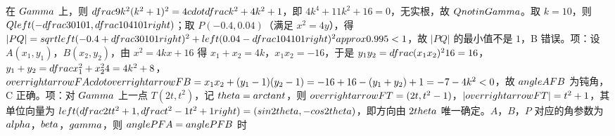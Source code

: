 在 $\\Gamma$ 上，则 $\\dfrac{9k^{2}}{(k^{2}+1)^{2}}=4\\cdot\\dfrac{k^{2}+4}{k^{2}+1}$，即 $4k^{4}+11k^{2}+16=0$，无实根，故 $Q\\notin\\Gamma$。取 $k=10$，则 $Q\\left(-\\dfrac{30}{101},\\dfrac{104}{101}\\right)$；取 $P(-0.4,0.04)$（满足 $x^{2}=4y$），得 $|PQ|=\\sqrt{\\left(-0.4+\\dfrac{30}{101}\\right)^{2}+\\left(0.04-\\dfrac{104}{101}\\right)^{2}}\\approx0.995<1$，故 $|PQ|$ 的最小值不是 $1$，B 错误。\nC 项：设 $A(x_{1},y_{1})$，$B(x_{2},y_{2})$，由 $x^{2}=4kx+16$ 得 $x_{1}+x_{2}=4k$，$x_{1}x_{2}=-16$，于是 $y_{1}y_{2}=\\dfrac{(x_{1}x_{2})^{2}}{16}=16$，$y_{1}+y_{2}=\\dfrac{x_{1}^{2}+x_{2}^{2}}{4}=4k^{2}+8$，\n$\\overrightarrow{FA}\\cdot\\overrightarrow{FB}=x_{1}x_{2}+(y_{1}-1)(y_{2}-1)=-16+16-(y_{1}+y_{2})+1=-7-4k^{2}<0$，故 $\\angle AFB$ 为钝角，C 正确。\nD 项：对 $\\Gamma$ 上一点 $T(2t,t^{2})$，记 $\\theta=\\arctan t$，则 $\\overrightarrow{FT}=(2t,t^{2}-1)$，$|\\overrightarrow{FT}|=t^{2}+1$，其单位向量为 $\\left(\\dfrac{2t}{t^{2}+1},\\dfrac{t^{2}-1}{t^{2}+1}\\right)=(\\sin 2\\theta,-\\cos 2\\theta)$，即方向由 $2\\theta$ 唯一确定。 $A$，$B$，$P$ 对应的角参数为 $\\alpha$，$\\beta$，$\\gamma$，则 $\\angle PFA=\\angle PFB$ 时 